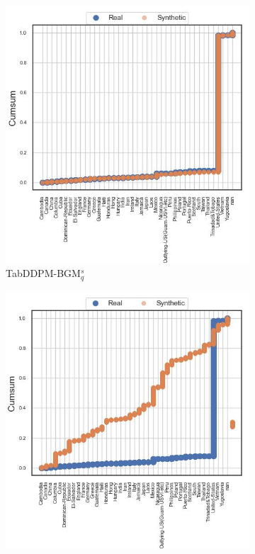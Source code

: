 \begin{figure}[H]
	\begin{subfigure}{0.32\textwidth}
		\centering
		\includegraphics[width=\textwidth]{images/cdf/tab-ddpm-bgm-simTune.jpg}
		\caption{TabDDPM-BGM$^{s}_q$}
	\end{subfigure}
	\begin{subfigure}{0.32\textwidth}
		\centering
		\includegraphics[width=\textwidth]{images/cdf/tab-ddpm-ft.jpg}

\end{subfigure}
\end{figure}
